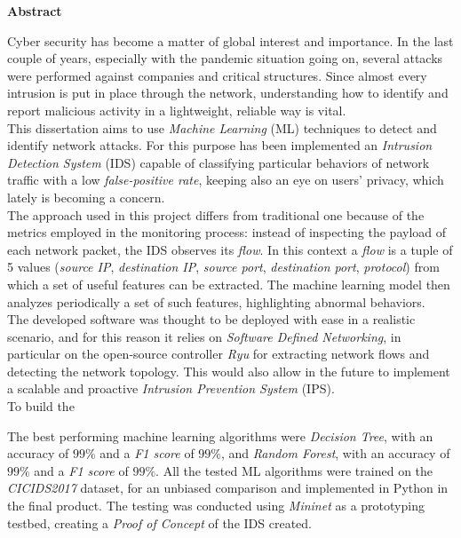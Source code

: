 \thispagestyle{empty}

{\bf\Huge Abstract}

\vspace{1cm}

\hfill\begin{minipage}{\dimexpr\textwidth-0.5cm}
    Cyber security has become a matter of global interest and importance. In the last couple of years, especially with the pandemic situation going on, several attacks were performed against companies and critical structures. Since almost every intrusion is put in place through the network, understanding how to identify and report malicious activity in a lightweight, reliable way is vital. \\ This dissertation aims to use \textit{Machine Learning} (ML) techniques to detect and identify network attacks. For this purpose has been implemented an \textit{Intrusion Detection System} (IDS) capable of classifying particular behaviors of network traffic with a low \textit{false-positive rate}, keeping also an eye on users' privacy, which lately is becoming a concern. \\ The approach used in this project differs from traditional one because of the metrics employed in the monitoring process: instead of inspecting the payload of each network packet, the IDS observes its \textit{flow}. In this context a \textit{flow} is a tuple of 5 values (\textit{source IP}, \textit{destination IP}, \textit{source port}, \textit{destination port}, \textit{protocol}) from which a set of useful features can be extracted. The machine learning model then analyzes periodically a set of such features, highlighting abnormal behaviors. \\ The developed software was thought to be deployed with ease in a realistic scenario, and for this reason it relies on \textit{Software Defined Networking}, in particular on the open-source controller \textit{Ryu} for extracting network flows and detecting the network topology. This would also allow in the future to implement a scalable and proactive \textit{Intrusion Prevention System} (IPS). \\ To build the 
    
    The best performing machine learning algorithms were \textit{Decision Tree}, with an accuracy of $99\%$ and a \textit{F1 score} of $99\%$, and \textit{Random Forest}, with an accuracy of $99\%$ and a \textit{F1 score} of $99\%$. All the tested ML algorithms were trained on the \textit{CICIDS2017} dataset, for an unbiased comparison and implemented in Python in the final product. The testing was conducted using \textit{Mininet} as a prototyping testbed, creating a \textit{Proof of Concept} of the IDS created.
    \end{minipage}

